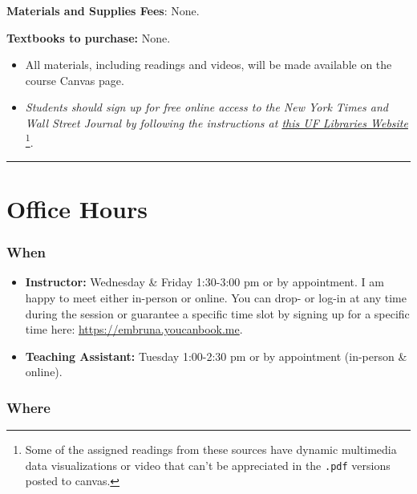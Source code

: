 \documentclass[
  10pt,
  letterpaper,
  oneside,
  open=any]{scrbook}
\begin{document}
\textbf{Materials and Supplies Fees}: None.

\textbf{Textbooks to purchase:} None.

\begin{itemize}
\item
  All materials, including readings and videos, will be made available
  on the course Canvas page. \bigskip
\item
  \emph{Students should sign up for free online access to the New York
  Times and Wall Street Journal by following the instructions at
  \href{https://businesslibrary.uflib.ufl.edu/c.php?g=943928&p=7708734}{this
  UF Libraries Website}} \footnote{Some of the assigned readings from
    these sources have dynamic multimedia data visualizations or video
    that can't be appreciated in the \texttt{.pdf} versions posted to
    canvas.}.
\end{itemize}

\begin{center}\rule{0.5\linewidth}{0.5pt}\end{center}


\chapter{Office Hours}\label{office-hours}

\subsection*{When}\label{when}

\begin{itemize}
\item
  \textbf{Instructor:} Wednesday \& Friday 1:30-3:00 pm or by
  appointment. I am happy to meet either in-person or online. You can
  drop- or log-in at any time during the session or guarantee a specific
  time slot by signing up for a specific time here:
  \url{https://embruna.youcanbook.me}.
\item
  \textbf{Teaching Assistant:} Tuesday 1:00-2:30 pm or by appointment
  (in-person \& online).
\end{itemize}

\subsection*{Where}\label{where}
\end{document}

